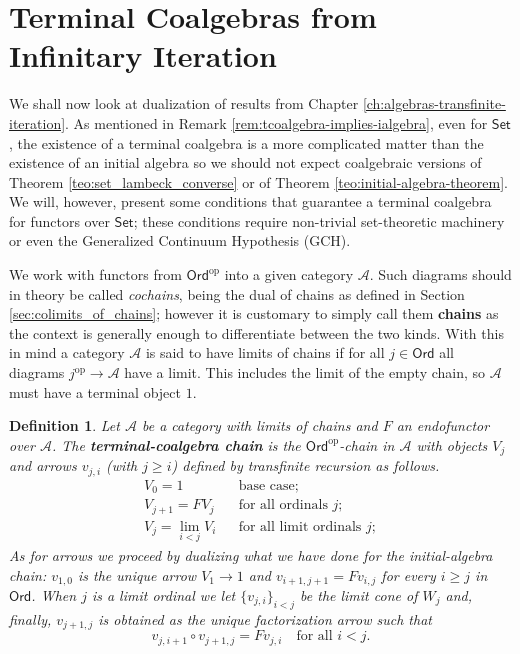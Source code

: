 \documentclass[letterpaper, 11pt, oneside]{memoir}
\theoremstyle{myteo}
\newtheorem{definition}[theorem]{Definition}
\numberwithin{equation}{section}
\newcommand{\marginnote}[1]{\marginpar{\footnotesize #1}}
\newcommand{\Ord}{\textsf{Ord}}
\newcommand{\Set}{\textsf{Set}}
\newcommand{\op}{\text{op}}
\newcommand{\A}{\mathscr{A}}
\begin{document}
\section{Terminal Coalgebras from Infinitary Iteration}

We shall now look at dualization of results from Chapter \ref{ch:algebras-transfinite-iteration}.
As mentioned in Remark \ref{rem:tcoalgebra-implies-ialgebra}, even for \(\Set\), the existence of a terminal coalgebra is a more complicated matter than the existence of an initial algebra so we should not expect coalgebraic versions of Theorem \ref{teo:set_lambeck_converse} or of Theorem \ref{teo:initial-algebra-theorem}.
We will, however, present some conditions that guarantee a terminal coalgebra for functors over \(\Set\); these conditions require non-trivial set-theoretic machinery or even the Generalized Continuum Hypothesis (GCH).

We work with functors from \(\Ord^\op\) into a given category \(\A\).
Such diagrams should in theory be called \textit{cochains}, being the dual of chains as defined in Section \ref{sec:colimits_of_chains}; however it is customary to simply call them \textbf{chains} as the context is generally enough to differentiate between the two kinds.
With this in mind a category \(\A\) is said to have limits of chains if for all \(j \in \Ord\) all diagrams \(j^\op \to \A\) have a limit.
This includes the limit of the empty chain, so \(\A\) must have a terminal object \(1\).

\begin{definition}
  Let \(\A\) be a category with limits of chains and \(F\) an endofunctor over \(\A\).
  The \textbf{terminal-coalgebra chain}\marginnote{terminal-coalgebra chain} is the \(\Ord^\op\)-chain in \(\A\) with objects \(V_j\) and arrows \(v_{j,i}\) (with \(j \geq i\)) defined by transfinite recursion as follows.
  \begin{align*}
    V_0 = 1 && \text{base case};\\
    V_{j+1} = FV_j && \text{for all ordinals \(j\)};\\
    V_j = \lim_{i < j}V_i && \text{for all limit ordinals \(j\)};
  \end{align*}
  As for arrows we proceed by dualizing what we have done for the initial-algebra chain: \(v_{1, 0}\) is the unique arrow \(V_1 \to 1\) and \(v_{i+1, j+1} = F v_{i, j}\) for every \(i \geq j\) in \(\Ord\).
  When \(j\) is a limit ordinal we let \(\{v_{j, i}\}_{i < j}\) be the limit cone of \(W_j\) and, finally, \(v_{j+1, j}\) is obtained as the unique factorization arrow such that
  \begin{equation*}
    v_{j, i + 1} \circ v_{j+1, j} = Fv_{j, i} \quad \text{for all \(i < j\)}.
  \end{equation*}
\end{definition}
\end{document}
